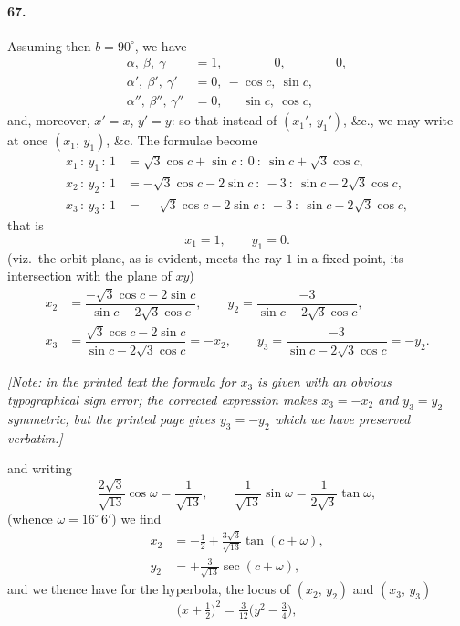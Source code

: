 \documentclass[11pt]{article}
\begin{document}
\paragraph{67.} Assuming then $b=90^{\circ}$, we have
\[
\begin{aligned}
\alpha,\ \beta,\ \gamma &= 1,\ \phantom{-\cos c,}\ 0,\ \phantom{-\sin c,}\ 0,\\
\alpha',\ \beta',\ \gamma' &= 0,\ -\cos c,\ \sin c,\\
\alpha'',\, \beta'',\, \gamma'' &= 0,\ \phantom{-}\sin c,\ \cos c,
\end{aligned}
\]
and, moreover, $x'=x$, $y'=y$: so that instead of $(x_{1}',\, y_{1}')$, \&c., we may write at once $(x_{1},\, y_{1})$, \&c. The formulae become
\[
\begin{aligned}
x_{1}\,:\,y_{1}\,:\,1 &= \sqrt{3}\cos c + \sin c\ :\ 0\ :\ \sin c + \sqrt{3}\cos c,\\
x_{2}\,:\,y_{2}\,:\,1 &= -\sqrt{3}\cos c - 2\sin c\ :\ -3\ :\ \sin c - 2\sqrt{3}\cos c,\\
x_{3}\,:\,y_{3}\,:\,1 &= \phantom{-}\sqrt{3}\cos c - 2\sin c\ :\ -3\ :\ \sin c - 2\sqrt{3}\cos c,
\end{aligned}
\]
that is
\[
x_{1} = 1,\qquad y_{1} = 0.
\]
(viz.\ the orbit-plane, as is evident, meets the ray $1$ in a fixed point, its intersection with the plane of $xy$)
\[
\begin{aligned}
x_{2} &= \dfrac{-\sqrt{3}\cos c - 2\sin c}{\sin c - 2\sqrt{3}\cos c},\qquad y_{2} = \dfrac{-3}{\sin c - 2\sqrt{3}\cos c},\\[4pt]
x_{3} &= \dfrac{\sqrt{3}\cos c - 2\sin c}{\sin c - 2\sqrt{3}\cos c} = -x_{2},\qquad y_{3} = \dfrac{-3}{\sin c - 2\sqrt{3}\cos c} = -y_{2}.
\end{aligned}
\]

\medskip

\noindent\textit{[Note: in the printed text the formula for $x_{3}$ is given with an obvious typographical sign error; the corrected expression makes $x_{3} = -x_{2}$ and $y_{3} = y_{2}$ symmetric, but the printed page gives $y_{3} = -y_{2}$ which we have preserved verbatim.]}

\medskip
and writing
\[
\dfrac{2\sqrt{3}}{\sqrt{13}}\cos\omega = \dfrac{1}{\sqrt{13}},\qquad \dfrac{1}{\sqrt{13}}\sin\omega = \dfrac{1}{2\sqrt{3}}\tan\omega,
\]
(whence $\omega = 16^{\circ}\,6'$) we find
\[
\begin{aligned}
x_{2} &= -\tfrac{1}{2} + \tfrac{3\sqrt{3}}{\sqrt{13}}\tan(c+\omega),\\
y_{2} &= +\tfrac{3}{\sqrt{13}}\sec(c+\omega),
\end{aligned}
\]
and we thence have for the hyperbola, the locus of $(x_{2},\, y_{2})$ and $(x_{3},\, y_{3})$
\[
\bigl(x + \tfrac{1}{2}\bigr)^{2} = \tfrac{3}{12}\bigl(y^{2} - \tfrac{3}{4}\bigr),
\]
\end{document}
